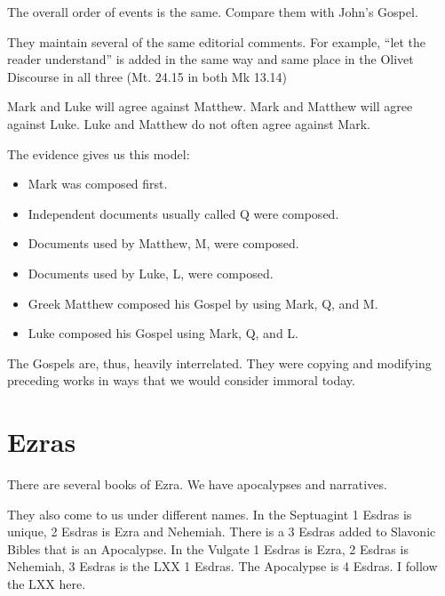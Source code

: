 \documentclass{beamer}
\begin{document}
\begin{frame}
  The overall order of events is the same.
  Compare them with John's Gospel.
\end{frame}

\begin{frame}
  They maintain several of the same editorial comments.
  For example, ``let the reader understand'' is added in the same way and same place in the Olivet Discourse in all three (Mt. 24.15 in both Mk 13.14)
\end{frame}

\begin{frame}
  Mark and Luke will agree against Matthew.
  Mark and Matthew will agree against Luke.
  Luke and Matthew do not often agree against Mark.
\end{frame}

\begin{frame}
  The evidence gives us this model:\pause
  \begin{itemize}
	\item Mark was composed first.\pause
	\item Independent documents usually called Q were composed.\pause
	\item Documents used by Matthew, M, were composed.\pause
	\item Documents used by Luke, L, were composed.\pause
	\item Greek Matthew composed his Gospel by using Mark, Q, and M.\pause
	\item Luke composed his Gospel using Mark, Q, and L.
  \end{itemize}
\end{frame}

\begin{frame}
  The Gospels are, thus, heavily interrelated.
  They were copying and modifying preceding works in ways that we would consider immoral today.
\end{frame}

\section{Ezras}

\begin{frame}
  There are several books of Ezra.
  We have apocalypses and narratives.
\end{frame}

\begin{frame}
  They also come to us under different names.
  In the Septuagint 1 Esdras is unique, 2 Esdras is Ezra and Nehemiah.
  There is a 3 Esdras added to Slavonic Bibles that is an Apocalypse.
  In the Vulgate 1 Esdras is Ezra, 2 Esdras is Nehemiah, 3 Esdras is the LXX 1 Esdras.
  The Apocalypse is 4 Esdras.
  I follow the LXX here.
\end{frame}
\end{document}
